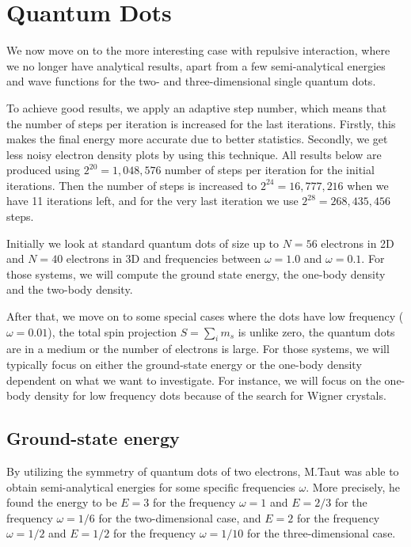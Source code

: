 \newpage
\section{Quantum Dots}
We now move on to the more interesting case with repulsive interaction, where we no longer have analytical results, apart from a few semi-analytical energies and wave functions  for the two- and three-dimensional single quantum dots.

To achieve good results, we apply an adaptive step number, which means that the number of steps per iteration is increased for the last iterations. Firstly, this makes the final energy more accurate due to better statistics. Secondly, we get less noisy electron density plots by using this technique. All results below are produced using $2^{20}=1,048,576$ number of steps per iteration for the initial iterations. Then the number of steps is increased to $2^{24}=16,777,216$ when we have 11 iterations left, and for the very last iteration we use $2^{28}=268,435,456$ steps.

Initially we look at standard quantum dots of size up to $N=56$ electrons in 2D and $N=40$ electrons in 3D and frequencies between $\omega=1.0$ and $\omega=0.1$. For those systems, we will compute the ground state energy, the one-body density and the two-body density. 

After that, we move on to some special cases where the dots have low frequency ($\omega=0.01$), the total spin projection $S=\sum_im_s$ is unlike zero, the quantum dots are in a medium or the number of electrons is large. For those systems, we will typically focus on either the ground-state energy or the one-body density dependent on what we want to investigate. For instance, we will focus on the one-body density for low frequency dots because of the search for Wigner crystals. 

\subsection{Ground-state energy}
By utilizing the symmetry of quantum dots of two electrons, M.Taut was able to obtain semi-analytical energies for some specific frequencies $\omega$. More precisely, he found the energy to be $E=3$ for the frequency $\omega=1$ and $E=2/3$ for the frequency $\omega=1/6$ for the two-dimensional case, and $E=2$ for the frequency $\omega=1/2$ and $E=1/2$ for the frequency $\omega=1/10$ for the three-dimensional case. \cite{taut_two_1993}\cite{taut_two_1994}

